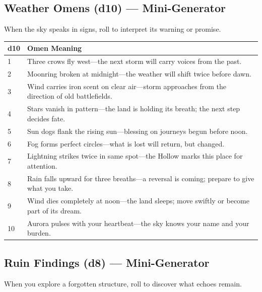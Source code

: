 \subsection*{Weather Omens (d10) --- Mini-Generator}
\label{sec:wilderness-weather-omens}
When the sky speaks in signs, roll to interpret its warning or promise.

\begin{longtable}{|p{1.5cm}|p{10cm}|}
\hline
\rowcolor{gray!20}
\textbf{d10} & \textbf{Omen Meaning} \\
\hline
1 & Three crows fly west---the next storm will carry voices from the past. \\
\hline
2 & Moonring broken at midnight---the weather will shift twice before dawn. \\
\hline
3 & Wind carries iron scent on clear air---storm approaches from the direction of old battlefields. \\
\hline
4 & Stars vanish in pattern---the land is holding its breath; the next step decides fate. \\
\hline
5 & Sun dogs flank the rising sun---blessing on journeys begun before noon. \\
\hline
6 & Fog forms perfect circles---what is lost will return, but changed. \\
\hline
7 & Lightning strikes twice in same spot---the Hollow marks this place for attention. \\
\hline
8 & Rain falls upward for three breaths---a reversal is coming; prepare to give what you take. \\
\hline
9 & Wind dies completely at noon---the land sleeps; move swiftly or become part of its dream. \\
\hline
10 & Aurora pulses with your heartbeat---the sky knows your name and your burden. \\
\hline
\end{longtable}

\subsection*{Ruin Findings (d8) --- Mini-Generator}
\label{sec:wilderness-ruin-findings}
When you explore a forgotten structure, roll to discover what echoes remain.

